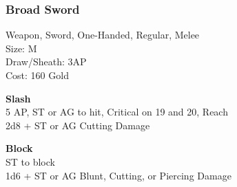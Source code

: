 \subsubsection{Broad Sword}\label{weapon:broadSword}
Weapon, Sword, One-Handed, Regular, Melee\\
Size: M\\
Draw/Sheath: 3AP\\
Cost: 160 Gold

\textbf{Slash}\\
5 AP, ST or AG to hit, Critical on 19 and 20,  Reach\\
2d8 + \texttimes ST or AG Cutting Damage

\textbf{Block}\\
ST to block\\
1d6 + \texttimes ST or AG Blunt, Cutting, or Piercing Damage

